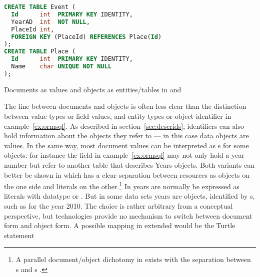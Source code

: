 \begin{example}

\begin{lstlisting}[language=SQL]
CREATE TABLE Event (
  Id      int  PRIMARY KEY IDENTITY,
  YearAD  int  NOT NULL,
  PlaceId int,
  FOREIGN KEY (PlaceId) REFERENCES Place(Id)
);
CREATE TABLE Place (
  Id      int  PRIMARY KEY IDENTITY,
  Name    char UNIQUE NOT NULL
);
\end{lstlisting}
\caption{Documents as values and objects as entities/tables in  and }
\label{ex:ormsql}
\end{example}

The line between documents and objects is often less clear than the distinction
between value types or field values, and entity types or object identifier in
example~\ref{ex:ormsql}. As described in section~\ref{sec:descrids},
identifiers can also hold information about the objects they refer to --- in
this case data objects are values. In the same way, most document
values can be interpreted as s for some objects:
for instance the  field in example~\ref{ex:ormsql} may not only
hold a year number but refer to another table that describes Years objects.
Both variants can better be shown in  which has a clear separation
between resources as objects on the one side and literals on the
other.\footnote{A parallel document/object dichotomy in  exists with
the separation between s and s \cite{Ayers2008}.} In  years are normally be expressed as
literals with datatype  or .  But in some data
sets years are objects, identified by s, such as
 for the year 2010. The choice is
rather arbitrary from a conceptual perspective, but  technologies
provide no mechanism to switch between document form and object form. A
possible mapping in extended  would be the Turtle statement


